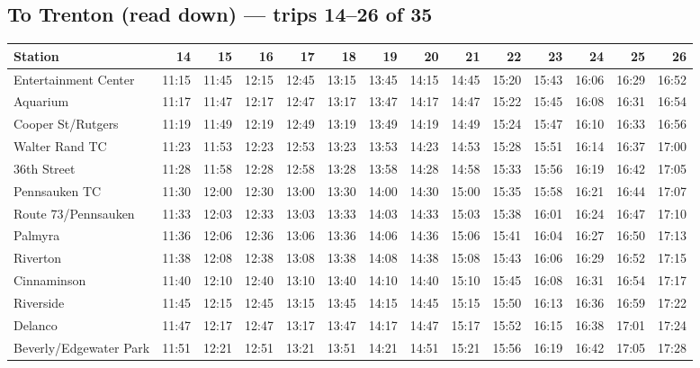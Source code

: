 \subsection*{To Trenton (read down) --- trips 14--26 of 35}
\begin{center}\footnotesize\setlength{\tabcolsep}{3pt}\begin{tabular}{@{}lrrrrrrrrrrrrr@{}}\toprule
Station & 14 & 15 & 16 & 17 & 18 & 19 & 20 & 21 & 22 & 23 & 24 & 25 & 26 \\\midrule
Entertainment Center & 11:15 & 11:45 & 12:15 & 12:45 & 13:15 & 13:45 & 14:15 & 14:45 & 15:20 & 15:43 & 16:06 & 16:29 & 16:52 \\
Aquarium & 11:17 & 11:47 & 12:17 & 12:47 & 13:17 & 13:47 & 14:17 & 14:47 & 15:22 & 15:45 & 16:08 & 16:31 & 16:54 \\
Cooper St/Rutgers & 11:19 & 11:49 & 12:19 & 12:49 & 13:19 & 13:49 & 14:19 & 14:49 & 15:24 & 15:47 & 16:10 & 16:33 & 16:56 \\
Walter Rand TC & 11:23 & 11:53 & 12:23 & 12:53 & 13:23 & 13:53 & 14:23 & 14:53 & 15:28 & 15:51 & 16:14 & 16:37 & 17:00 \\
36th Street & 11:28 & 11:58 & 12:28 & 12:58 & 13:28 & 13:58 & 14:28 & 14:58 & 15:33 & 15:56 & 16:19 & 16:42 & 17:05 \\
Pennsauken TC & 11:30 & 12:00 & 12:30 & 13:00 & 13:30 & 14:00 & 14:30 & 15:00 & 15:35 & 15:58 & 16:21 & 16:44 & 17:07 \\
Route 73/Pennsauken & 11:33 & 12:03 & 12:33 & 13:03 & 13:33 & 14:03 & 14:33 & 15:03 & 15:38 & 16:01 & 16:24 & 16:47 & 17:10 \\
Palmyra & 11:36 & 12:06 & 12:36 & 13:06 & 13:36 & 14:06 & 14:36 & 15:06 & 15:41 & 16:04 & 16:27 & 16:50 & 17:13 \\
Riverton & 11:38 & 12:08 & 12:38 & 13:08 & 13:38 & 14:08 & 14:38 & 15:08 & 15:43 & 16:06 & 16:29 & 16:52 & 17:15 \\
Cinnaminson & 11:40 & 12:10 & 12:40 & 13:10 & 13:40 & 14:10 & 14:40 & 15:10 & 15:45 & 16:08 & 16:31 & 16:54 & 17:17 \\
Riverside & 11:45 & 12:15 & 12:45 & 13:15 & 13:45 & 14:15 & 14:45 & 15:15 & 15:50 & 16:13 & 16:36 & 16:59 & 17:22 \\
Delanco & 11:47 & 12:17 & 12:47 & 13:17 & 13:47 & 14:17 & 14:47 & 15:17 & 15:52 & 16:15 & 16:38 & 17:01 & 17:24 \\
Beverly/Edgewater Park & 11:51 & 12:21 & 12:51 & 13:21 & 13:51 & 14:21 & 14:51 & 15:21 & 15:56 & 16:19 & 16:42 & 17:05 & 17:28 \\

\end{tabular}
\end{center}
